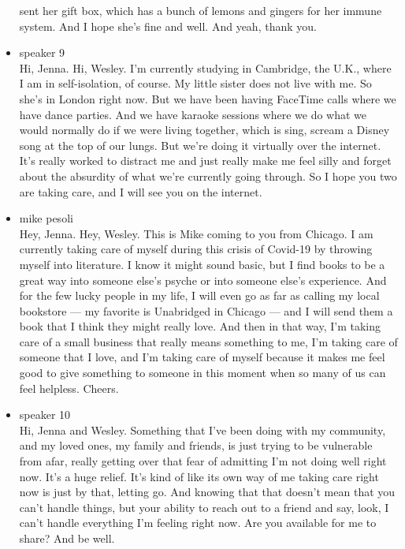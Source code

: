 \begin{itemize}
  sent her gift box, which has a bunch of lemons and gingers for her
  immune system. And I hope she's fine and well. And yeah, thank you.
\item
  speaker 9\\
  Hi, Jenna. Hi, Wesley. I'm currently studying in Cambridge, the U.K.,
  where I am in self-isolation, of course. My little sister does not
  live with me. So she's in London right now. But we have been having
  FaceTime calls where we have dance parties. And we have karaoke
  sessions where we do what we would normally do if we were living
  together, which is sing, scream a Disney song at the top of our lungs.
  But we're doing it virtually over the internet. It's really worked to
  distract me and just really make me feel silly and forget about the
  absurdity of what we're currently going through. So I hope you two are
  taking care, and I will see you on the internet.
\item
  mike pesoli\\
  Hey, Jenna. Hey, Wesley. This is Mike coming to you from Chicago. I am
  currently taking care of myself during this crisis of Covid-19 by
  throwing myself into literature. I know it might sound basic, but I
  find books to be a great way into someone else's psyche or into
  someone else's experience. And for the few lucky people in my life, I
  will even go as far as calling my local bookstore --- my favorite is
  Unabridged in Chicago --- and I will send them a book that I think
  they might really love. And then in that way, I'm taking care of a
  small business that really means something to me, I'm taking care of
  someone that I love, and I'm taking care of myself because it makes me
  feel good to give something to someone in this moment when so many of
  us can feel helpless. Cheers.
\item
  speaker 10\\
  Hi, Jenna and Wesley. Something that I've been doing with my
  community, and my loved ones, my family and friends, is just trying to
  be vulnerable from afar, really getting over that fear of admitting
  I'm not doing well right now. It's a huge relief. It's kind of like
  its own way of me taking care right now is just by that, letting go.
  And knowing that that doesn't mean that you can't handle things, but
  your ability to reach out to a friend and say, look, I can't handle
  everything I'm feeling right now. Are you available for me to share?
  And be well.
\end{itemize}

